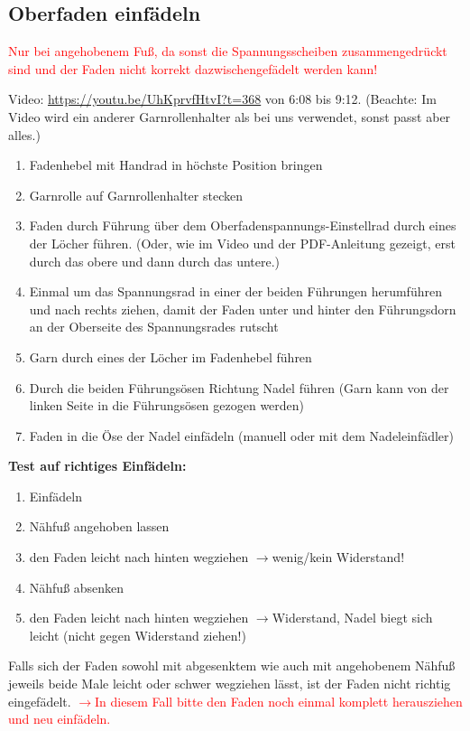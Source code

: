 \documentclass{\basedir/fablab-document}
\newcommand{\pfeil}{\ensuremath{\rightarrow}}
\begin{document}
\subsection{Oberfaden einfädeln}
\textcolor{red}{Nur bei angehobenem Fuß, da sonst die Spannungsscheiben zusammengedrückt sind und der Faden nicht korrekt dazwischengefädelt werden kann!}
\newline

Video: \url{https://youtu.be/UhKprvfHtvI?t=368} von 6:08 bis 9:12. (Beachte: Im Video wird ein anderer Garnrollenhalter als bei uns verwendet, sonst passt aber alles.)

\begin{enumerate}
	\item Fadenhebel mit Handrad in höchste Position bringen
	\item Garnrolle auf Garnrollenhalter stecken
	\item Faden durch Führung über dem Oberfadenspannungs-Einstellrad durch eines der Löcher führen. (Oder, wie im Video und der PDF-Anleitung gezeigt, erst durch das obere und dann durch das untere.)
	\item Einmal um das Spannungsrad in einer der beiden Führungen herumführen und nach rechts ziehen, damit der Faden unter und hinter den Führungsdorn an der Oberseite des Spannungsrades rutscht
	\item Garn durch eines der Löcher im Fadenhebel führen
	\item Durch die beiden Führungsösen Richtung Nadel führen (Garn kann von der linken Seite in die Führungsösen gezogen werden)
	\item Faden in die Öse der Nadel einfädeln (manuell oder mit dem Nadeleinfädler)
\end{enumerate}

\vspace{2em}

\textbf{Test auf richtiges Einfädeln:}
\begin{enumerate}
 \item Einfädeln
 \item Nähfuß angehoben lassen
 \item den Faden leicht nach hinten wegziehen \pfeil wenig/kein Widerstand!
 \item Nähfuß absenken
 \item den Faden leicht nach hinten wegziehen \pfeil Widerstand, Nadel biegt sich leicht (nicht gegen Widerstand ziehen!)
\end{enumerate}
Falls sich der Faden sowohl mit abgesenktem wie auch mit angehobenem Nähfuß jeweils beide Male leicht oder schwer wegziehen lässt, ist der Faden nicht richtig eingefädelt.
\newline
\textcolor{red}{\pfeil In diesem Fall bitte den Faden noch einmal komplett herausziehen und neu einfädeln.}
\end{document}
